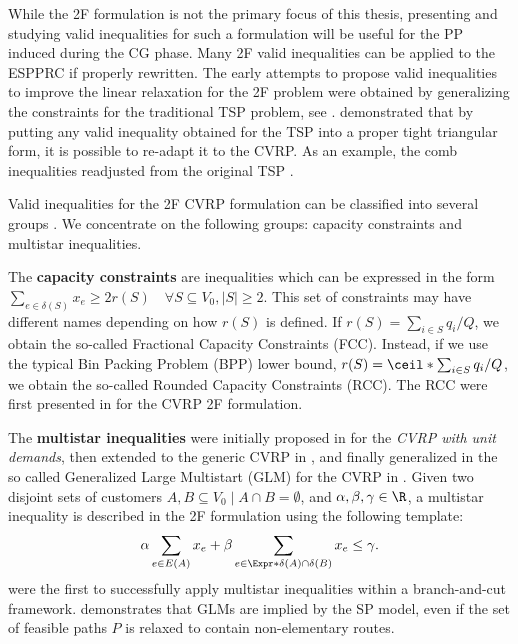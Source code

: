While the 2F formulation is not the primary focus of this thesis,
presenting and studying valid inequalities for such a formulation
will be useful for the PP induced during the CG phase.
Many 2F valid inequalities can be applied to the ESPPRC if properly rewritten.
The early attempts to propose valid inequalities to improve the linear relaxation
for the 2F problem were obtained by generalizing the constraints
for the traditional TSP problem, see \textcite{naddef1993}.
\citeauthor{naddef1993} demonstrated that by putting any valid inequality obtained for the TSP
into a proper tight triangular form, it is possible to re-adapt it to the CVRP.
As an example, the comb inequalities readjusted from the original TSP
\parencite{chvatal1973,grotschel1979,augerat1995approche}.

Valid inequalities for the 2F CVRP formulation can be classified into several groups \parencite{toth2014}.
We concentrate on the following groups: capacity constraints and multistar inequalities.

The \textbf{capacity constraints} are inequalities which can be expressed in the form
$\sum_{e \in \delta(S)} x_e \ge 2 r(S) \quad \forall S \subseteq V_0, |S| \ge 2$.
This set of constraints may have different names depending on how $r(S)$ is defined.
If $r(S) = \sum_{i \in S} q_i / Q$, we obtain the so-called Fractional Capacity Constraints (FCC).
Instead, if we use the typical Bin Packing Problem (BPP) lower bound, $r(S) = \ceil*{\sum_{i \in S} q_i / Q}$, we obtain the so-called Rounded Capacity Constraints (RCC).
The RCC were first presented in \textcite{laporte1983} for the CVRP 2F formulation.

The \textbf{multistar inequalities} were initially proposed in \textcite{araque1990}
for the \textit{CVRP with unit demands},
then extended to the generic CVRP in \textcite{gouveia1995, achuthan1998},
and finally generalized in the so called Generalized Large Multistart (GLM)
for the CVRP in \textcite{letchford2002,letchford2006}.
Given two disjoint sets of customers $A, B \subseteq V_0 \mid A \cap B = \emptyset$,
and $\alpha, \beta, \gamma \in \R$,
a multistar inequality is described in the 2F formulation using the following template:
\begin{equation}
	\alpha \sum_{e \in E(A)} x_e + \beta \sum_{e \in \Expr*{\delta(A) \cap \delta(B)}} x_e \le \gamma.
\end{equation}
\textcite{araqueg1994} were the first to successfully apply multistar inequalities
within a branch-and-cut framework.
\textcite{letchford2006} demonstrates that GLMs are implied by the SP model,
even if the set of feasible paths $P$ is relaxed to contain non-elementary routes.

